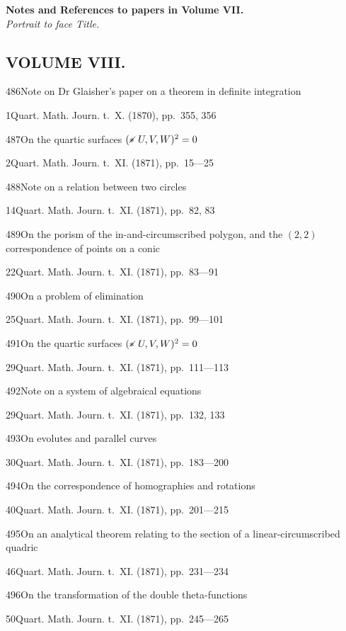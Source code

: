 \documentclass[11pt,a4paper]{book}
\providecommand{\tocentry}[2]{#1\dotfill #2\par}
\begin{document}
\vspace{1cm}
\noindent\textbf{Notes and References to papers in Volume VII.} \\
\noindent\textit{Portrait to face Title.}

\newpage

\subsection*{VOLUME VIII.}

\tocentry{486}{Note on Dr Glaisher's paper on a theorem in definite integration}{1}{Quart. Math. Journ. t.~X. (1870), pp.~355, 356}

\tocentry{487}{On the quartic surfaces $(* \!\!\! \raisebox{0.3ex}{\scriptsize$\diagup$} \, U, V, W)^2 = 0$}{2}{Quart. Math. Journ. t.~XI. (1871), pp.~15---25}

\tocentry{488}{Note on a relation between two circles}{14}{Quart. Math. Journ. t.~XI. (1871), pp.~82, 83}

\tocentry{489}{On the porism of the in-and-circumscribed polygon, and the $(2, 2)$ correspondence of points on a conic}{22}{Quart. Math. Journ. t.~XI. (1871), pp.~83---91}

\tocentry{490}{On a problem of elimination}{25}{Quart. Math. Journ. t.~XI. (1871), pp.~99---101}

\tocentry{491}{On the quartic surfaces $(* \!\!\! \raisebox{0.3ex}{\scriptsize$\diagup$} \, U, V, W)^2 = 0$}{29}{Quart. Math. Journ. t.~XI. (1871), pp.~111---113}

\tocentry{492}{Note on a system of algebraical equations}{29}{Quart. Math. Journ. t.~XI. (1871), pp.~132, 133}

\tocentry{493}{On evolutes and parallel curves}{30}{Quart. Math. Journ. t.~XI. (1871), pp.~183---200}

\newpage

\tocentry{494}{On the correspondence of homographies and rotations}{40}{Quart. Math. Journ. t.~XI. (1871), pp.~201---215}

\tocentry{495}{On an analytical theorem relating to the section of a linear-circumscribed quadric}{46}{Quart. Math. Journ. t.~XI. (1871), pp.~231---234}

\tocentry{496}{On the transformation of the double theta-functions}{50}{Quart. Math. Journ. t.~XI. (1871), pp.~245---265}
\end{document}
